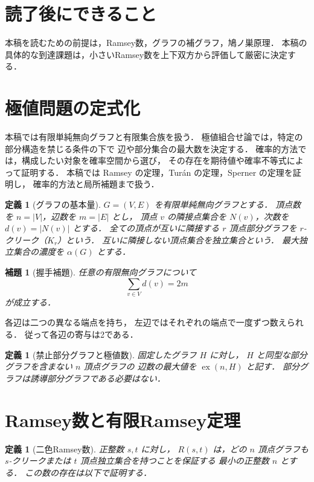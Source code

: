 \documentclass[a5paper,10pt,onecolumn]{jsarticle}
\makeatletter
\theoremstyle{mathnotetheorem}
\newtheorem{definition}[theorem]{定義}
\newtheorem{lemma}[theorem]{補題}
\renewcommand{\proofname}{証明}
\renewenvironment{proof}[1][\proofname]{%
  \par\pushQED{\qed}\normalfont\topsep4\p@\@plus2\p@\relax
  \trivlist\item[\hskip\labelsep\bfseries #1]\ignorespaces
}{\popQED\endtrivlist\@endpefalse}
\makeatother
\begin{document}
\section*{読了後にできること}
本稿を読むための前提は，Ramsey数，グラフの補グラフ，鳩ノ巣原理．
本稿の具体的な到達課題は，小さいRamsey数を上下双方から評価して厳密に決定する．

\section{極値問題の定式化}
本稿では有限単純無向グラフと有限集合族を扱う．
極値組合せ論では，特定の部分構造を禁じる条件の下で
辺や部分集合の最大数を決定する．
確率的方法では，構成したい対象を確率空間から選び，
その存在を期待値や確率不等式によって証明する．
本稿では Ramsey の定理，Tur\'an の定理，Sperner の定理を証明し，
確率的方法と局所補題まで扱う．

\begin{definition}[グラフの基本量]
$G=(V,E)$ を有限単純無向グラフとする．
頂点数を $n=|V|$，辺数を $m=|E|$ とし，
頂点 $v$ の隣接点集合を $N(v)$，次数を $d(v)=|N(v)|$ とする．
全ての頂点が互いに隣接する $r$ 頂点部分グラフを
$r$-クリーク（$K_r$）という．
互いに隣接しない頂点集合を独立集合という．
最大独立集合の濃度を $\alpha(G)$ とする．
\end{definition}

\begin{lemma}[握手補題]\label{lem:handshake}
任意の有限無向グラフについて
\[
 \sum_{v\in V}d(v)=2m
\]
が成立する．
\end{lemma}
\begin{proof}
各辺は二つの異なる端点を持ち，
左辺ではそれぞれの端点で一度ずつ数えられる．
従って各辺の寄与は2である．
\end{proof}

\begin{definition}[禁止部分グラフと極値数]
固定したグラフ $H$ に対し，
$H$ と同型な部分グラフを含まない $n$ 頂点グラフの
辺数の最大値を $\operatorname{ex}(n,H)$ と記す．
部分グラフは誘導部分グラフである必要はない．
\end{definition}

\section{Ramsey数と有限Ramsey定理}
\begin{definition}[二色Ramsey数]
正整数 $s,t$ に対し，
$R(s,t)$ は，どの $n$ 頂点グラフも
$s$-クリークまたは $t$ 頂点独立集合を持つことを保証する
最小の正整数 $n$ とする．
この数の存在は以下で証明する．
\end{definition}
\end{document}
